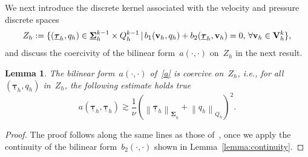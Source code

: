 \documentclass[a4paper,twoside,10pt]{article}
\theoremstyle{plain}
\newtheorem{lemma}[theorem]{Lemma}
\theoremstyle{remark}
\theoremstyle{definition}
\numberwithin{equation}{section}
\numberwithin{figure}{section}
\newcommand{\Norm}[1]{{\left\|{#1} \right\|}}
\newcommand{\Sigmah}{\underline{\boldsymbol{\Sigma}}_h}
\newcommand{\Sigmahkmo}{\Sigmah^{k-1}}
\newcommand{\Vh}{{\bf{V}}_h}
\newcommand{\Vhk}{\Vh^k}
\newcommand{\Qh}{Q_h}
\newcommand{\Qhkmo}{\Qh^{k-1}}
\newcommand{\taubfh}{\underline{\boldsymbol{\tau}}_h}
\newcommand{\vbfh}{\mathbf{v}_h}
\newcommand{\qh}{q_h}
\newcommand{\bone}{b_1}
\newcommand{\btwo}{b_2}
\newcommand{\Zh}{Z_h}
\begin{document}
We next introduce the discrete kernel
associated with the velocity and pressure discrete spaces
\begin{equation*}
\Zh := \{ (\taubfh, \qh) \in \Sigmahkmo \times \Qhkmo \, | \, \bone(\vbfh,\qh) + \btwo(\taubfh,\vbfh) = 0,
            \, \forall \vbfh \in \Vhk \},
\end{equation*}
and discuss the coercivity of the bilinear form~$a(\cdot,\cdot)$ on~$\Zh$
in the next result.
\begin{lemma} \label{lemma_coercivity-kernel}
The bilinear form~$a(\cdot,\cdot)$ of~\eqref{a}
is coercive on~$\Zh$, i.e.,
for all $(\taubfh,\qh)$ in~$\Zh$,
the following estimate holds true
\begin{equation*}
a(\taubfh,\taubfh) \gtrsim \frac{1}{\nu}(\Norm{\taubfh}_{\Sigmah} + \Norm{\qh}_{\Qh})^2.
\end{equation*}
\end{lemma}
\begin{proof}
The proof follows along the same lines as those of~\cite[Lemma~6.4]{Gopalakrishnan-Lederer-Schoberl:2020},
once we apply the continuity of the bilinear form~$\btwo(\cdot,\cdot)$ shown in Lemma~\ref{lemma:continuity}.
\end{proof}
\end{document}
